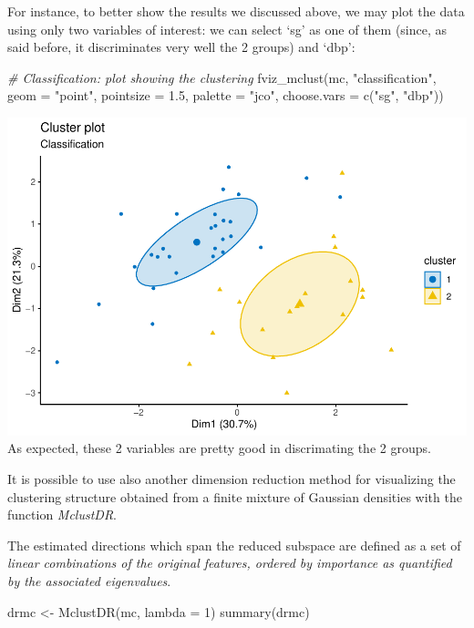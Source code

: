 \documentclass[
]{article}
\newenvironment{Shaded}{\begin{snugshade}}{\end{snugshade}}
\newcommand{\AttributeTok}[1]{\textcolor[rgb]{0.77,0.63,0.00}{#1}}
\newcommand{\CommentTok}[1]{\textcolor[rgb]{0.56,0.35,0.01}{\textit{#1}}}
\newcommand{\DecValTok}[1]{\textcolor[rgb]{0.00,0.00,0.81}{#1}}
\newcommand{\FloatTok}[1]{\textcolor[rgb]{0.00,0.00,0.81}{#1}}
\newcommand{\FunctionTok}[1]{\textcolor[rgb]{0.00,0.00,0.00}{#1}}
\newcommand{\NormalTok}[1]{#1}
\newcommand{\OtherTok}[1]{\textcolor[rgb]{0.56,0.35,0.01}{#1}}
\newcommand{\StringTok}[1]{\textcolor[rgb]{0.31,0.60,0.02}{#1}}
\begin{document}
For instance, to better show the results we discussed above, we may plot
the data using only two variables of interest: we can select `sg' as one
of them (since, as said before, it discriminates very well the 2 groups)
and `dbp':

\begin{Shaded}
\begin{Highlighting}[]
\CommentTok{\# Classification: plot showing the clustering}
\FunctionTok{fviz\_mclust}\NormalTok{(mc, }\StringTok{"classification"}\NormalTok{, }\AttributeTok{geom =} \StringTok{"point"}\NormalTok{, }
            \AttributeTok{pointsize =} \FloatTok{1.5}\NormalTok{, }\AttributeTok{palette =} \StringTok{"jco"}\NormalTok{, }
            \AttributeTok{choose.vars =} \FunctionTok{c}\NormalTok{(}\StringTok{"sg"}\NormalTok{, }\StringTok{"dbp"}\NormalTok{))}
\end{Highlighting}
\end{Shaded}

\includegraphics{clustering_files/figure-latex/unnamed-chunk-88-1.pdf}
As expected, these 2 variables are pretty good in discrimating the 2
groups.

It is possible to use also another dimension reduction method for
visualizing the clustering structure obtained from a finite mixture of
Gaussian densities with the function \emph{MclustDR}.

The estimated directions which span the reduced subspace are defined as
a set of \emph{linear combinations of the original features, ordered by
importance as quantified by the associated eigenvalues}.

\begin{Shaded}
\begin{Highlighting}[]
\NormalTok{drmc }\OtherTok{\textless{}{-}} \FunctionTok{MclustDR}\NormalTok{(mc, }\AttributeTok{lambda =} \DecValTok{1}\NormalTok{)}
\FunctionTok{summary}\NormalTok{(drmc)}
\end{Highlighting}
\end{Shaded}
\end{document}
